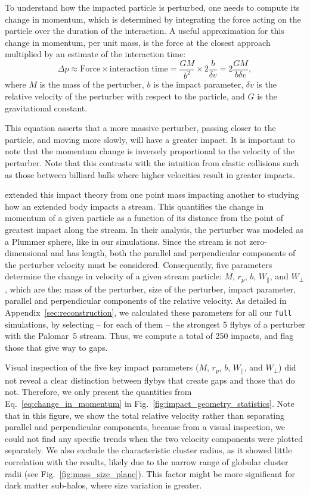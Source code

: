 \documentclass[draft]{aa}
\begin{document}
    To understand how the impacted particle is perturbed, one needs to compute its change in momentum, which is determined by integrating the force acting on the particle over the duration of the interaction. A useful approximation for this change in momentum, per unit mass, is the force at the closest approach multiplied by an estimate of the interaction time:
    \begin{equation} \label{eq:change_in_momentum} \Delta p \approx \text{Force} \times \text{interaction time} = \frac{GM}{b^2} \times 2\frac{b}{\delta v} = 2\frac{GM}{b \delta v}, \end{equation}where $M$ is the mass of the perturber, $b$ is the impact parameter, $\delta v$ is the relative velocity of the perturber with respect to the particle, and $G$ is the gravitational constant. 


    This equation asserts that a more massive perturber, passing closer to the particle, and moving more slowly, will have a greater impact. It is important to note that the momentum change is inversely proportional to the velocity of the perturber. Note that this contrasts with the intuition from elastic collisions such as those between billiard balls where higher velocities result in greater impacts.

    \citet{2015MNRAS.450.1136E} extended this impact theory from one point mass impacting another to studying how an extended body impacts a stream. This quantifies the change in momentum of a given particle as a function of its distance from the point of greatest impact along the stream. In their analysis, the perturber was modeled as a Plummer sphere, like in our simulations. Since the stream is not zero-dimensional and has length, both the parallel and perpendicular components of the perturber velocity must be considered. Consequently, five parameters determine the change in velocity of a given stream particle: $M$, $r_p$, $b$, $W_\parallel$, and $W_\perp$, which are the: mass of the perturber, size of the perturber, impact parameter, parallel and perpendicular components of the relative velocity. As detailed in Appendix~\ref{sec:reconstruction}, we calculated these parameters for all our \texttt{full} simulations, by selecting -- for each of them --  the strongest 5 flybys of a perturber with the Palomar~5 stream. Thus, we compute a total of  250 impacts, and flag those that give way to gaps. 


    Visual inspection of the five key impact parameters ($M$, $r_p$, $b$, $W_\parallel$, and $W_\perp$) did not reveal a clear distinction between flybys that create gaps and those that do not. Therefore, we only present the quantities from Eq.~\ref{eq:change_in_momentum} in Fig.~\ref{fig:impact_geometry_statistics}. 
    Note that in this figure, we show the total relative velocity rather than separating parallel and perpendicular components, because from a visual inspection, we could not find any specific trends when the two velocity components were plotted separately. We also exclude the characteristic cluster radius, as it showed little correlation with the results, likely due to the narrow range of globular cluster radii (see Fig.~\ref{fig:mass_size_plane}). This factor might be more significant for dark matter sub-halos, where size variation is greater.
      
\end{document}
